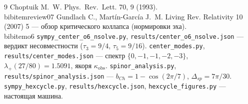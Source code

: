\documentclass[11pt,a4paper]{article}
\newcommand{\tauu}{\tau_{3}}
\newcommand{\tauf}{\tau_{5}}
\begin{document}
\begin{thebibliography}{9}
 Choptuik M.~W. Phys.~Rev.~Lett. 70, 9 (1993).
\\bibitem{review07} Gundlach C., Martín-García J.~M. Living Rev. Relativity 10 (2007) 5 --- обзор критического коллапса (нормировки эха).
\\bibitem{o6} \texttt{sympy\_center\_o6\_nsolve.py},
  \texttt{results/center\_o6\_nsolve.json} --- вердикт несовместности
  ($\tauu = 9/4$, $\tauf = 9/16$).
 \texttt{center\_modes.py},
  \texttt{results/center\_modes.json} --- спектр $\{0,-1,-1,-2,-3\}$,
  $\lambda_+(27/80) = 1.5091$, якоря $\kappa_{\mathrm{obs}}$.
 \texttt{spinor\_analysis.py},
  \texttt{results/spinor\_analysis.json} --- $b_{Ch} = 1-\cos(2\pi/7)$,
  $\Delta_{sp} = 7\pi/30$.
 \texttt{sympy\_hexcycle.py}, \texttt{results/hexcycle.json},
  \texttt{hexcycle\_figures.py} --- настоящая машина.
\end{thebibliography}
\end{document}
